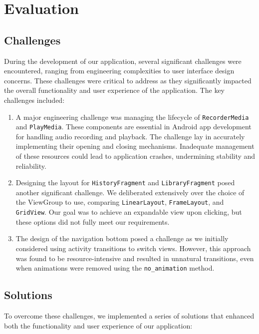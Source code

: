 \documentclass[conference,10pt,letterpaper]{IEEEtran}
\begin{document}
	\section{Evaluation}
	\subsection{Challenges}
	During the development of our application, several significant challenges were encountered, ranging from engineering complexities to user interface design concerns. These challenges were critical to address as they significantly impacted the overall functionality and user experience of the application. The key challenges included:
	
	\begin{enumerate}
		\item A major engineering challenge was managing the lifecycle of \texttt{RecorderMedia} and \texttt{PlayMedia}. These components are essential in Android app development for handling audio recording and playback. The challenge lay in accurately implementing their opening and closing mechanisms. Inadequate management of these resources could lead to application crashes, undermining stability and reliability.
		
		\item Designing the layout for \texttt{HistoryFragment} and \texttt{LibraryFragment} posed another significant challenge. We deliberated extensively over the choice of the ViewGroup to use, comparing \texttt{LinearLayout}, \texttt{FrameLayout}, and \texttt{GridView}. Our goal was to achieve an expandable view upon clicking, but these options did not fully meet our requirements.
		
		\newpage
		\item The design of the navigation bottom posed a challenge as we initially considered using activity transitions to switch views. However, this approach was found to be resource-intensive and resulted in unnatural transitions, even when animations were removed using the \texttt{no\_animation} method.
	\end{enumerate}
	
	\subsection{Solutions}
	To overcome these challenges, we implemented a series of solutions that enhanced both the functionality and user experience of our application:
	
\end{document}
